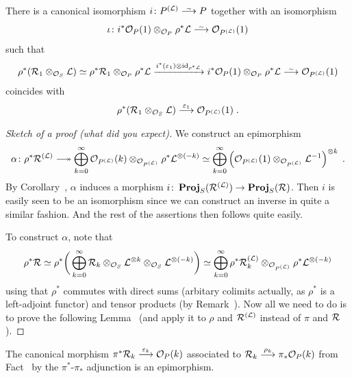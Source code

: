 \documentclass[a4paper,parskip=half,numbers=enddot, DIV=12]{scrreprt}
\begin{document}
\begin{cor}
	There is a canonical isomorphism $i\colon P^{(\Ll)}\isomorphism P$ together with an isomorphism 
	\begin{align*}
		\iota\colon i^*\Oo_{P}(1)\otimes_{\Oo_{P}}\rho^*\Ll\isomorphism\Oo_{P^{(\Ll)}}(1)
	\end{align*}
	such that
	\begin{align*}
		\rho^*(\Rr_1\otimes_{\Oo_S}\Ll)\simeq \rho^*\Rr_1\otimes_{\Oo_{P}}\rho^*\Ll\xrightarrow{i^*(\epsilon_1)\otimes\id_{\rho^*\Ll}}i^*\Oo_{P}(1)\otimes_{\Oo_{P}}\rho^*\Ll\isomorphism\Oo_{P^{(\Ll)}}(1)
	\end{align*}
	coincides with
	\begin{align*}
		\rho^*(\Rr_1\otimes_{\Oo_S}\Ll)\morphism[\epsilon_1]\Oo_{P^{(\Ll)}}(1)\;.
	\end{align*}
\end{cor}
\begin{proof}[Sketch of a proof (what did you expect)]
	We construct an epimorphism
	\begin{align*}
		\alpha\colon \rho^*\Rr^{(\Ll)}\epimorphism \bigoplus_{k=0}^\infty\Oo_{P^{(\Ll)}}(k)\otimes_{\Oo_{P^{(\Ll)}}}\rho^*\Ll^{\otimes( -k)}\simeq \bigoplus_{k=0}^\infty\left(\Oo_{P^{(\Ll)}}(1)\otimes_{\Oo_{P^{(\Ll)}}}\Ll^{-1}\right)^{\otimes k}\;.
	\end{align*}
	By Corollary~, $\alpha$ induces a morphism $i\colon\PROJ_S(\Rr^{(\Ll)})\morphism\PROJ_S(\Rr)$. Then $i$ is easily seen to be an isomorphism since we can construct an inverse in quite a similar fashion. And the rest of the assertions then follows quite easily.
	
	To construct $\alpha$, note that 
	\begin{align*}
		\rho^*\mathcal{R}\simeq \rho^*\bigg(\bigoplus_{k=0}^\infty\mathcal{R}_k\otimes_{\mathcal{O}_S}\mathcal{L}^{\otimes k}\otimes_{\mathcal{O}_S}\mathcal{L}^{\otimes(-k)}\bigg)\simeq \bigoplus_{k=0}^\infty\rho^*\mathcal{R}_k^{(\mathcal{L})}\otimes_{\mathcal{O}_{P^{(\mathcal{L})}}}\rho^*\mathcal{L}^{\otimes(-k)}
	\end{align*}
	using that $\rho^*$ commutes with direct sums (arbitary colimits actually, as $\rho^*$ is a left-adjoint functor) and tensor products (by Remark~). Now all we need to do is to prove the following Lemma~ (and apply it to $\rho$ and $\mathcal{R}^{(\mathcal{L})}$ instead of $\pi$ and $\mathcal{R}$).
\end{proof}
\begin{lem}
	The canonical morphism $\pi^*\Rr_k\morphism[\epsilon_k]\Oo_P(k)$ associated to $\Rr_k\morphism[\rho_k]\pi_*\Oo_P(k)$ from Fact~ by the $\pi^*$-$\pi_*$ adjunction is an epimorphism.
\end{lem}
\end{document}
